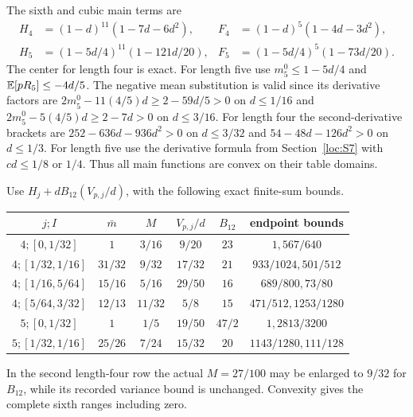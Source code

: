 The sixth and cubic main terms are
\begin{align*}
 H_4&=(1-d)^{11}(1-7d-6d^2),&F_4&=(1-d)^5(1-4d-3d^2),\\
 H_5&=(1-5d/4)^{11}(1-121d/20),&F_5&=(1-5d/4)^5(1-73d/20).
\end{align*}
The center for length four is exact. For length five use
$m_5^0\le1-5d/4$ and $\mathbb E[pR_5]\le-4d/5$.
The negative mean substitution is valid since its derivative factors are
$2m_5^0-11(4/5)d\ge2-59d/5>0$ on $d\le1/16$ and
$2m_5^0-5(4/5)d\ge2-7d>0$ on $d\le3/16$.
For length four the second-derivative brackets are
$252-636d-936d^2>0$ on $d\le3/32$ and
$54-48d-126d^2>0$ on $d\le1/3$.
For length five use the derivative formula from Section~\ref{loc:S7}
with $cd\le1/8$ or $1/4$. Thus all main functions are convex on their
table domains.

Use $H_j+dB_{12}(V_{p,j}/d)$, with the following exact finite-sum bounds.
\begin{center}\small
\begin{tabular}{@{}cccccc@{}}\toprule
$j;I$&$\bar m$&$M$&$V_{p,j}/d$&$B_{12}$&endpoint bounds\\\midrule
$4;[0,1/32]$&$1$&$3/16$&$9/20$&$23$&$1,567/640$\\
$4;[1/32,1/16]$&$31/32$&$9/32$&$17/32$&$21$&$933/1024,501/512$\\
$4;[1/16,5/64]$&$15/16$&$5/16$&$29/50$&$16$&$689/800,73/80$\\
$4;[5/64,3/32]$&$12/13$&$11/32$&$5/8$&$15$&$471/512,1253/1280$\\
$5;[0,1/32]$&$1$&$1/5$&$19/50$&$47/2$&$1,2813/3200$\\
$5;[1/32,1/16]$&$25/26$&$7/24$&$15/32$&$20$&$1143/1280,111/128$\\\bottomrule
\end{tabular}
\end{center}
In the second length-four row the actual $M=27/100$ may be enlarged to
$9/32$ for $B_{12}$, while its recorded variance bound is unchanged.
Convexity gives the complete sixth ranges including zero.

